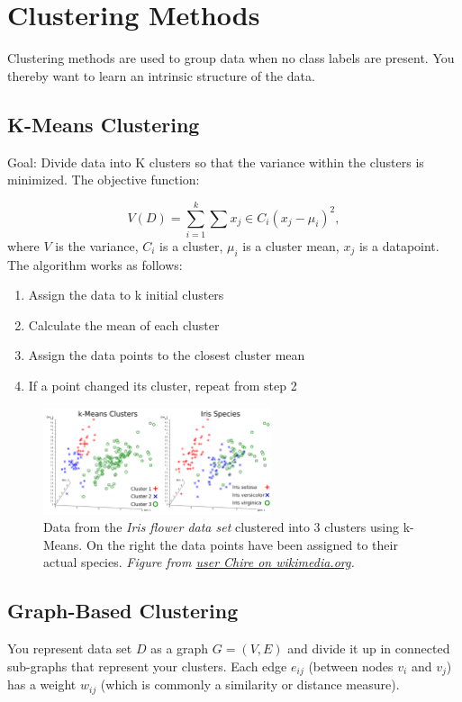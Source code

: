 \documentclass[../main.tex]{subfiles}
\begin{document}
\section{Clustering Methods} \label{Clustering Methods}
Clustering methods are used to group data when no class labels are present. You thereby want to learn an intrinsic structure of the data.

\subsection{K-Means Clustering}
Goal: Divide data into K clusters so that the variance within the clusters is minimized. The objective function: 

\begin{equation}
    V(D) = \sum_{i=1}^k \sum{x_j \in C_i} (x_j - \mu_i)^2,    
\end{equation}
where $V$ is the variance, $C_i$ is a cluster, $\mu_i$ is a cluster mean, $x_j$ is a datapoint. The algorithm works as follows: 
\begin{enumerate}
    \item Assign the data to k initial clusters
    \item Calculate the mean of each cluster
    \item Assign the data points to the closest cluster mean
    \item If a point changed its cluster, repeat from step 2
\end{enumerate}

\begin{figure}[h]
    \centering
    \includegraphics[width=0.6\textwidth]{../figures/kMeans.png}
    \caption{Data from the \textit{Iris flower data set} clustered into 3 clusters using k-Means. On the right the data points have been assigned to their actual species. \textit{Figure from \href{https://commons.wikimedia.org/wiki/File:Autoencoder_schema.png}{user Chire on wikimedia.org}.}}
    \label{CDF}
\end{figure}

\subsection{Graph-Based Clustering}
    You represent data set $D$ as a graph $G=(V,E)$ and divide it up in connected sub-graphs that represent your clusters. Each edge $e_{ij}$ (between nodes $v_i$ and $v_j$) has a weight $w_{ij}$ (which is commonly a similarity or distance measure).
\end{document}
